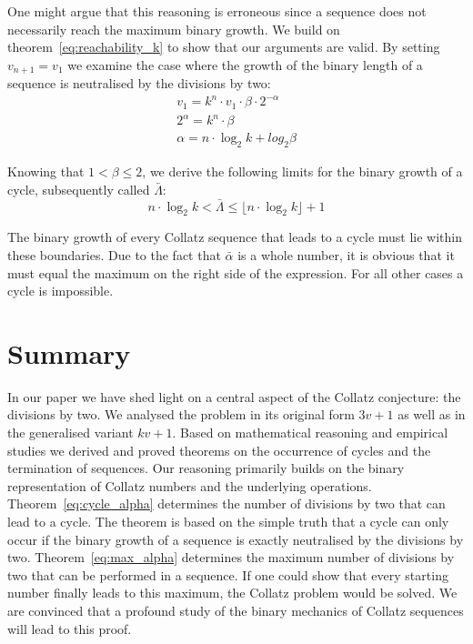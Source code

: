 \documentclass{SciPress_2015}
\renewcommand{\large}{\fontsize{14}{18pt}\selectfont}
\newcommand{\titleformat}{\sffamily\bfseries \large}						%
\begin{document}
\par\medskip
One might argue that this reasoning is erroneous since a sequence does not necessarily reach the maximum binary growth. We build on theorem~\ref{eq:reachability_k} to show that our arguments are valid. By setting $v_{n+1}=v_1$ we examine the case where the growth of the binary length of a sequence is neutralised by the divisions by two:
\[
\begin{array}{l}
v_1=k^n\cdot v_1\cdot\beta\cdot2^{-\alpha}\\
2^{\alpha}=k^n\cdot\beta\\
\alpha=n\cdot\log_2k+log_2\beta
\end{array}
\]

Knowing that $1<\beta\le2$, we derive the following limits for the binary growth of a cycle, subsequently called $\bar\Lambda$:
\[
n\cdot\log_2k<\bar\Lambda\le\lfloor n\cdot\log_2k\rfloor+1
\]

The binary growth of every Collatz sequence that leads to a cycle must lie within these boundaries. Due to the fact that $\bar\alpha$ is a whole number, it is obvious that it must equal the maximum on the right side of the expression. For all other cases a cycle is impossible.

\section{Summary}
In our paper we have shed light on a central aspect of the Collatz conjecture: the divisions by two. We analysed the problem in its original form $3v+1$ as well as in the generalised variant $kv+1$. Based on mathematical reasoning and empirical studies we derived and proved theorems on the occurrence of cycles and the termination of sequences. Our reasoning primarily builds on the binary representation of Collatz numbers and the underlying operations. Theorem~\ref{eq:cycle_alpha} determines the number of divisions by two that can lead to a cycle. The theorem is based on the simple truth that a cycle can only occur if the binary growth of a sequence is exactly neutralised by the divisions by two. Theorem~\ref{eq:max_alpha} determines the maximum number of divisions by two that can be performed in a sequence. If one could show that every starting number finally leads to this maximum, the Collatz problem would be solved. We are convinced that a profound study of the binary mechanics of Collatz sequences will lead to this proof.\\[1.5em]

\par\noindent
{\titleformat{Appendix}}
\end{document}
